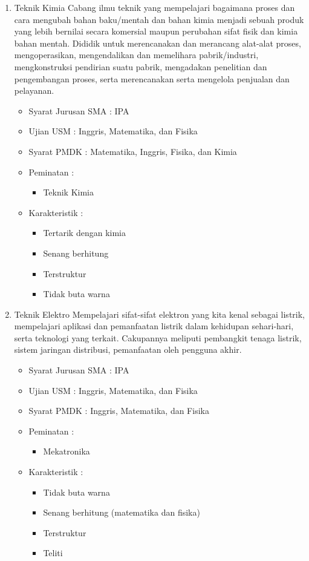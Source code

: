 \documentclass[a4paper,twoside]{article}
\begin{document}
\begin{enumerate}
\begin{enumerate}
\begin{enumerate}
				\item Teknik Kimia
					Cabang ilmu teknik yang mempelajari bagaimana proses dan cara mengubah bahan baku/mentah dan bahan kimia menjadi sebuah produk yang lebih bernilai secara komersial maupun perubahan sifat fisik dan kimia bahan mentah. Dididik untuk merencanakan dan merancang alat-alat proses, mengoperasikan, mengendalikan dan memelihara pabrik/industri, mengkonstruksi pendirian suatu pabrik, mengadakan penelitian dan pengembangan proses, serta merencanakan serta mengelola penjualan dan pelayanan.
					\begin{itemize}
						\item Syarat Jurusan SMA : IPA
						\item Ujian USM : Inggris, Matematika, dan Fisika
						\item Syarat PMDK : Matematika, Inggris, Fisika, dan Kimia
						\item Peminatan :
						\begin{itemize}
							\item Teknik Kimia
						\end{itemize}
						\item Karakteristik :
						\begin{itemize}
							\item Tertarik dengan kimia
							\item Senang berhitung
							\item Terstruktur
							\item Tidak buta warna
						\end{itemize}
					\end{itemize}
					
				\item Teknik Elektro
					Mempelajari sifat-sifat elektron yang kita kenal sebagai listrik, mempelajari aplikasi dan pemanfaatan listrik dalam kehidupan sehari-hari, serta teknologi yang terkait. Cakupannya meliputi pembangkit tenaga listrik, sistem jaringan distribusi, pemanfaatan oleh pengguna akhir.
					\begin{itemize}
						\item Syarat Jurusan SMA : IPA
						\item Ujian USM : Inggris, Matematika, dan Fisika
						\item Syarat PMDK :  Inggris, Matematika, dan Fisika
						\item Peminatan :
						\begin{itemize}
							\item Mekatronika
						\end{itemize}
						\item Karakteristik :
						\begin{itemize}
							\item Tidak buta warna
							\item Senang berhitung (matematika dan fisika)
							\item Terstruktur
							\item Teliti
						\end{itemize}
					\end{itemize}
			\end{enumerate}
			

\end{enumerate}
\end{enumerate}
\end{document}
